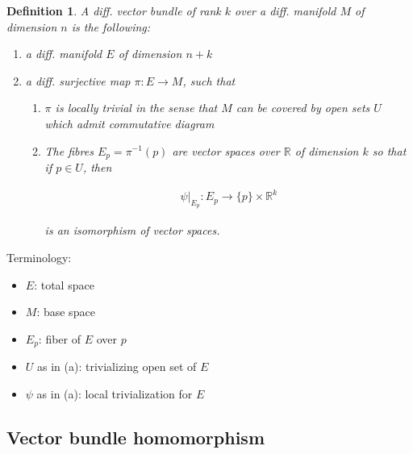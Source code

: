 \documentclass{scrartcl}
\newcommand{\R}{\mathbb R}
\newtheorem*{mydef}{Definition}
\begin{document}
\begin{mydef}
  A diff. \emph{vector bundle} of rank $k$ over a diff. manifold $M$ of dimension $n$ is the following:

  \begin{enumerate}
  \item a diff. manifold $E$ of dimension $n+k$
  \item a diff. surjective map $\pi:E\rightarrow M$, such that 
    \begin{enumerate}
    \item $\pi$ is locally trivial in the sense that $M$ can be covered by open sets $U$ which admit commutative diagram

    \item The fibres $E_p = \pi^{-1}(p)$ are vector spaces over $\R$ of dimension $k$ so that if $p\in U$, then

      \begin{align}
        \psi|_{E_p} : E_p \rightarrow \{p\}\times\R^k
      \end{align}

      is an isomorphism of vector spaces.
    \end{enumerate}
  \end{enumerate}
\end{mydef}

Terminology:

\begin{itemize}
\item $E$: total space
\item $M$: base space
\item $E_p$: fiber of $E$ over $p$
\item $U$ as in (a): trivializing open set of $E$
\item $\psi$ as in (a): local trivialization for $E$
\end{itemize}

\subsection{Vector bundle homomorphism}
\end{document}
